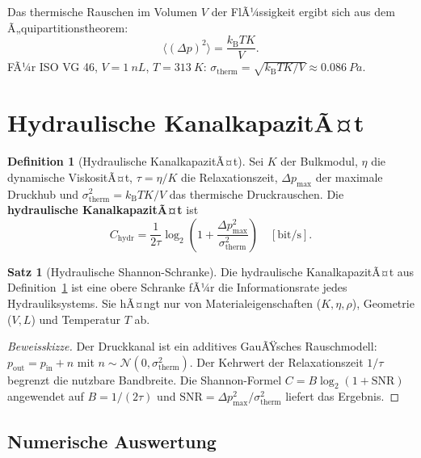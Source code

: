﻿\documentclass[a4paper,12pt]{scrreprt}
\theoremstyle{definition}
\newtheorem{definition}{Definition}[section]
\newtheorem{satz}{Satz}[section]
\newcommand{\kb}{k_\mathrm{B}}
\begin{document}
Das thermische Rauschen im Volumen $V$ der FlÃ¼ssigkeit ergibt sich
aus dem Ã„quipartitionstheorem:
\[
  \langle(\Delta p)^2\rangle = \frac{\kb T K}{V}.
\]
FÃ¼r ISO VG 46, $V=\SI{1}{nL}$, $T=\SI{313}{K}$:
$\sigma_{\mathrm{therm}} = \sqrt{\kb T K / V} \approx \SI{0.086}{Pa}$.

\section{Hydraulische KanalkapazitÃ¤t}

\begin{definition}[Hydraulische KanalkapazitÃ¤t]
  \label{def:nf5_chydr}
  Sei $K$ der Bulkmodul, $\eta$ die dynamische ViskositÃ¤t,
  $\tau = \eta/K$ die Relaxationszeit, $\Delta p_{\max}$ der maximale
  Druckhub und $\sigma_{\mathrm{therm}}^2 = \kb T K / V$ das thermische
  Druckrauschen. Die \textbf{hydraulische KanalkapazitÃ¤t} ist
  \[
    C_{\mathrm{hydr}} = \frac{1}{2\tau}
    \log_2\!\left(1 + \frac{\Delta p_{\max}^2}{\sigma_{\mathrm{therm}}^2}\right)
    \quad [\mathrm{bit/s}].
  \]
\end{definition}

\begin{satz}[Hydraulische Shannon-Schranke]
  Die hydraulische KanalkapazitÃ¤t aus Definition~\ref{def:nf5_chydr}
  ist eine obere Schranke fÃ¼r die Informationsrate jedes
  Hydrauliksystems. Sie hÃ¤ngt nur von Materialeigenschaften
  ($K, \eta, \rho$), Geometrie ($V, L$) und Temperatur $T$ ab.
\end{satz}

\begin{proof}[Beweisskizze]
  Der Druckkanal ist ein additives GauÃŸsches Rauschmodell:
  $p_{\mathrm{out}} = p_{\mathrm{in}} + n$ mit
  $n \sim \mathcal{N}(0, \sigma_{\mathrm{therm}}^2)$. Der
  Kehrwert der Relaxationszeit $1/\tau$ begrenzt die nutzbare
  Bandbreite. Die Shannon-Formel $C = B\log_2(1+\mathrm{SNR})$
  angewendet auf $B=1/(2\tau)$ und $\mathrm{SNR} =
  \Delta p_{\max}^2/\sigma_{\mathrm{therm}}^2$ liefert das Ergebnis.
\end{proof}

\subsection{Numerische Auswertung}
\end{document}
